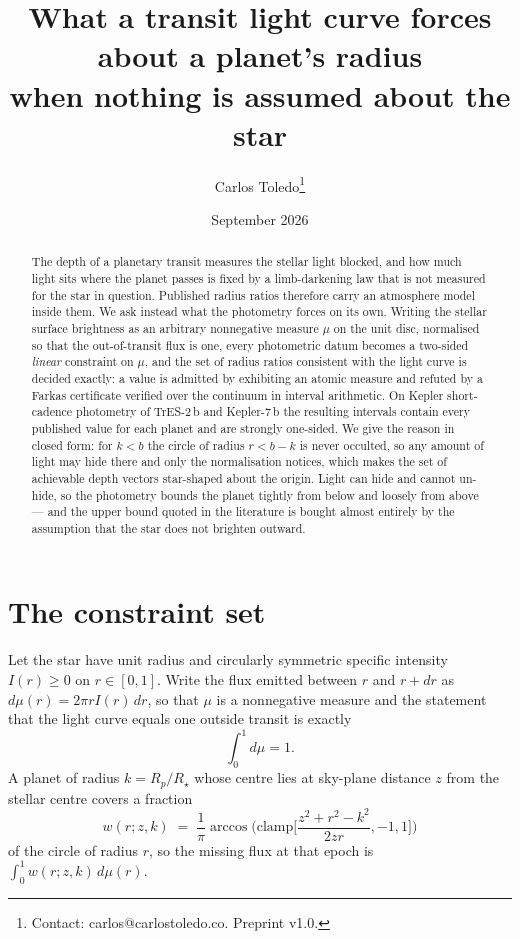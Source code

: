 \documentclass[11pt]{article}
\title{What a transit light curve forces about a planet's radius\\
when nothing is assumed about the star}
\author{Carlos Toledo\thanks{Contact: carlos@carlostoledo.co.
Preprint v1.0. %
}}
\date{September 2026}
\begin{document}
\maketitle

\begin{abstract}
The depth of a planetary transit measures the stellar light blocked, and how
much light sits where the planet passes is fixed by a limb-darkening law that is
not measured for the star in question. Published radius ratios therefore carry an
atmosphere model inside them. We ask instead what the photometry forces on its
own. Writing the stellar surface brightness as an arbitrary nonnegative measure
$\mu$ on the unit disc, normalised so that the out-of-transit flux is one, every
photometric datum becomes a two-sided \emph{linear} constraint on $\mu$, and the
set of radius ratios consistent with the light curve is decided exactly: a value
is admitted by exhibiting an atomic measure and refuted by a Farkas certificate
verified over the continuum in interval arithmetic. On Kepler short-cadence
photometry of TrES-2\,b and Kepler-7\,b the resulting intervals contain every
published value for each planet and are strongly one-sided. We give the reason
in closed form: for $k<b$ the circle of radius $r<b-k$ is never occulted, so any
amount of light may hide there and only the normalisation notices, which makes
the set of achievable depth vectors star-shaped about the origin. Light can hide
and cannot un-hide, so the photometry bounds the planet tightly from below and
loosely from above --- and the upper bound quoted in the literature is bought
almost entirely by the assumption that the star does not brighten outward.
\end{abstract}

\section{The constraint set}

Let the star have unit radius and circularly symmetric specific intensity
$I(r)\ge 0$ on $r\in[0,1]$. Write the flux emitted between $r$ and $r+dr$ as
$d\mu(r)=2\pi r I(r)\,dr$, so that $\mu$ is a nonnegative measure and the
statement that the light curve equals one outside transit is exactly
\begin{equation}
\int_0^1 d\mu = 1 .
\label{eq:norm}
\end{equation}
A planet of radius $k=R_p/R_\star$ whose centre lies at sky-plane distance $z$
from the stellar centre covers a fraction
\begin{equation}
w(r;z,k)\;=\;\frac{1}{\pi}\arccos\!\Big(\mathrm{clamp}\Big[\frac{z^2+r^2-k^2}{2zr},-1,1\Big]\Big)
\label{eq:kernel}
\end{equation}
of the circle of radius $r$, so the missing flux at that epoch is
$\int_0^1 w(r;z,k)\,d\mu(r)$.
\end{document}
